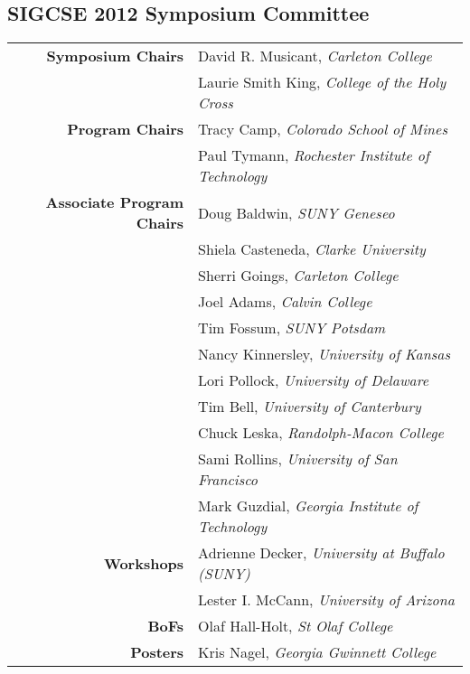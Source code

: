 \newpage
\begin{center}
	\section*{SIGCSE 2012 Symposium Committee}
\end{center}

\vspace{-\baselineskip}
{\raggedright
\begin{tabular}[l]{@{}rp{2.75in}}
	{\textbf{Symposium Chairs}} &
	David R. Musicant, \textit{Carleton College} \\
	& Laurie Smith King, \textit{College of the Holy Cross} \\

	{\textbf{Program Chairs}} &
	Tracy Camp, \textit{Colorado School of Mines} \\
	& \parbox{2.75in}{\raggedright Paul Tymann, \textit{Rochester Institute of Technology}} \\

	{\textbf{Associate Program Chairs}} &
	Doug Baldwin, \textit{SUNY Geneseo} \\
    & Shiela Casteneda, \emph{Clarke University} \\
	& Sherri Goings, \emph{Carleton College} \\
	& Joel Adams, \emph{Calvin College} \\
	& Tim Fossum, \emph{SUNY Potsdam} \\
	& Nancy Kinnersley, \emph{University of Kansas} \\
	& Lori Pollock, \emph{University of Delaware} \\
	& Tim Bell, \emph{University of Canterbury} \\
	& Chuck Leska, \emph{Randolph-Macon College} \\
	& Sami Rollins, \emph{University of San Francisco} \\
	& \parbox{2.75in}{\raggedright Mark Guzdial, \emph{Georgia Institute of Technology}} \\
	{\textbf{Workshops}} &
	Adrienne Decker, \emph{University at Buffalo (SUNY)} \\
	& Lester I. McCann, \emph{University of Arizona} \\

	\textbf{BoFs} & Olaf Hall-Holt, \emph{St Olaf College} \\

	\textbf{Posters} & Kris Nagel, \emph{Georgia Gwinnett College} \\


\end{tabular}}
